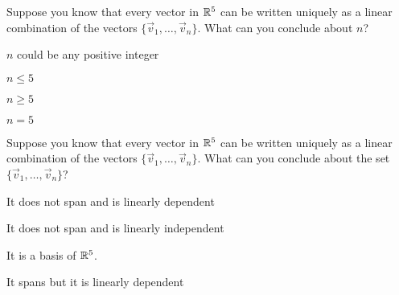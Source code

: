 \documentclass{article}
\begin{document}
\begin{readinessAssuranceTest}
\item Suppose you know that every vector in $\mathbb{R}^5$ can be written uniquely as a linear combination of the vectors $\{\vec{v}_1, \ldots, \vec{v}_n\}$.  What can you conclude about $n$?
\begin{readinessAssuranceTestChoices}
\item $n$ could be any positive integer
\item $n \leq 5$
\item $n \geq 5$
\item $n=5$
\end{readinessAssuranceTestChoices}

\item Suppose you know that every vector in $\mathbb{R}^5$ can be written uniquely as a linear combination of the vectors $\{\vec{v}_1, \ldots, \vec{v}_n\}$.  What can you conclude about the set $\{\vec{v}_1, \ldots, \vec{v}_n\}$?
\begin{readinessAssuranceTestChoices}
\item It does not span and is linearly dependent
\item It does not span and is linearly independent
\item It is a basis of $\mathbb{R}^5$.
\item It spans but it is linearly dependent
\end{readinessAssuranceTestChoices}

\end{readinessAssuranceTest}
\end{document}

